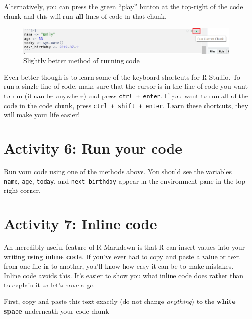 \documentclass[]{book}
\begin{document}
Alternatively, you can press the green ``play'' button at the top-right of the code chunk and this will run \textbf{all} lines of code in that chunk.

\begin{figure}

{\centering \includegraphics[width=1\linewidth]{images/run2} 

}

\caption{Slightly better method of running code}\label{fig:img-run2}
\end{figure}

Even better though is to learn some of the keyboard shortcuts for R Studio. To run a single line of code, make sure that the cursor is in the line of code you want to run (it can be anywhere) and press \texttt{ctrl\ +\ enter}. If you want to run all of the code in the code chunk, press \texttt{ctrl\ +\ shift\ +\ enter}. Learn these shortcuts, they will make your life easier!

\hypertarget{activity-6-run-your-code}{%
\section{Activity 6: Run your code}\label{activity-6-run-your-code}}

Run your code using one of the methods above. You should see the variables \texttt{name}, \texttt{age}, \texttt{today}, and \texttt{next\_birthday} appear in the environment pane in the top right corner.

\hypertarget{activity-7-inline-code}{%
\section{Activity 7: Inline code}\label{activity-7-inline-code}}

An incredibly useful feature of R Markdown is that R can insert values into your writing using \textbf{inline code}. If you've ever had to copy and paste a value or text from one file in to another, you'll know how easy it can be to make mistakes. Inline code avoids this. It's easier to show you what inline code does rather than to explain it so let's have a go.

First, copy and paste this text exactly (do not change \emph{anything}) to the \textbf{white space} underneath your code chunk.
\end{document}
